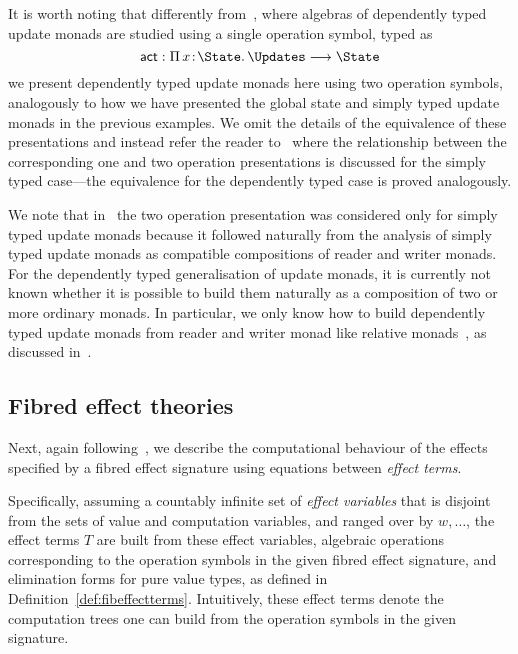 It is worth noting that differently from~\cite{Ahman:UpdateMonads}, where algebras of dependently typed update monads are studied using a single operation symbol, typed as 
\[
\mathsf{act} : \Pi\, x \!:\! \State .\, \Updates \longrightarrow \State
\]
we present dependently typed update monads here using two operation symbols, analogously to how we have presented the global state and simply typed update monads in the previous examples.  We omit the details of the equivalence of these presentations and instead refer the reader to~\cite[Section~2.3]{Ahman:UpdateMonads} where the relationship between the corresponding one and two operation presentations is discussed for the simply typed case---the equivalence for the dependently typed case is proved analogously. 

We note that in~\cite{Ahman:UpdateMonads} the two operation presentation was considered only for simply typed update monads because it followed naturally from the analysis of simply typed update monads as compatible compositions of reader and writer monads. 
For the dependently typed generalisation of update monads, it is currently not known whether it is possible to build them naturally as a composition of two or more ordinary monads. 
In particular, we only know how to build dependently typed update monads from reader and writer monad like relative monads~\cite{Altenkirch:RelMon2}, as discussed in~\cite[Section~3]{Ahman:UpdateMonads}.

\subsection{Fibred effect theories}

Next, again following~\cite{Plotkin:HandlingEffects}, we describe the computational behaviour of the  effects specified by a fibred effect signature using equations between \emph{effect terms}. 

Specifically, assuming a countably infinite set of \emph{effect variables} that is disjoint from the sets of value and computation variables, and ranged over by $w, \ldots$, the effect terms $T$ are built from these effect variables, algebraic operations corresponding to the operation symbols in the given fibred effect signature, and elimination forms for pure value types, as defined in Definition~\ref{def:fibeffectterms}. 
Intuitively, these effect terms denote the computation trees one can build from the operation symbols in the given signature.


